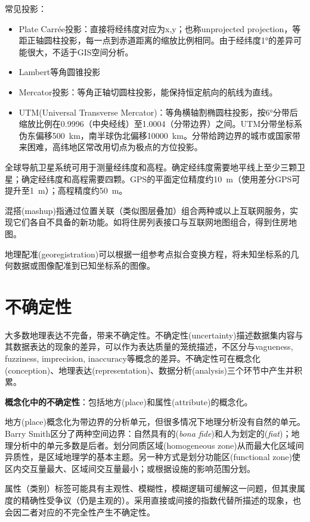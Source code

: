 \par 常见投影：
\begin{itemize}
    \item Plate Carr\'{e}e投影：直接将经纬度对应为x,y；也称unprojected projection，等距正轴圆柱投影，每一点到赤道距离的缩放比例相同。由于经纬度1°的差异可能很大，不适于GIS空间分析。
    \item Lambert等角圆锥投影
    \item Mercator投影：等角正轴切圆柱投影，能保持恒定航向的航线为直线。
    \item UTM(Universal Transverse Mercator)：等角横轴割椭圆柱投影，按6°分带后缩放比例在0.9996（中央经线）至1.0004（分带边界）之间。UTM分带坐标系伪东偏移\SI{500}{\kilo\metre}，南半球伪北偏移\SI{10000}{\kilo\metre}。分带给跨边界的城市或国家带来困难，高纬地区常改用切点为极点的方位投影。
\end{itemize}

\par 全球导航卫星系统可用于测量经纬度和高程。确定经纬度需要地平线上至少三颗卫星；确定经纬度和高程需要四颗。GPS的平面定位精度约\SI{10}{\metre}（使用差分GPS可提升至\SI{1}{\metre}）；高程精度约\SI{50}{\metre}。

\par 混搭(mashup)指通过位置关联（类似图层叠加）组合两种或以上互联网服务，实现它们各自不具备的新功能。如将住房列表接口与互联网地图组合，得到住房地图。

\par 地理配准(georegistration)可以根据一组参考点拟合变换方程，将未知坐标系的几何数据或图像配准到已知坐标系的图像。

\section{不确定性}

\par 大多数地理表达不完备，带来不确定性。不确定性(uncertainty)描述数据集内容与其数据表达的现象的差异，可以作为表达质量的笼统描述，不区分与vagueness, fuzziness, imprecision, inaccuracy等概念的差异。不确定性可在概念化(conception)、地理表达(representation)、数据分析(analysis)三个环节中产生并积累。

\par \textbf{概念化中的不确定性}：包括地方(place)和属性(attribute)的概念化。
\par 地方(place)概念化为带边界的分析单元，但很多情况下地理分析没有自然的单元。Barry Smith区分了两种空间边界：自然具有的(\emph{bona fide})和人为划定的(\emph{fiat})；地理分析中的单元多数是后者。划分同质区域(homogeneous zone)从而最大化区域间异质性，是区域地理学的基本主题。另一种方式是划分功能区(functional zone)使区内交互量最大、区域间交互量最小；或根据设施的影响范围分划。
\par 属性（类别）标签可能具有主观性、模糊性，模糊逻辑可缓解这一问题，但其隶属度的精确性受争议（仍是主观的）。采用直接或间接的指数代替所描述的现象，也会因二者对应的不完全性产生不确定性。

